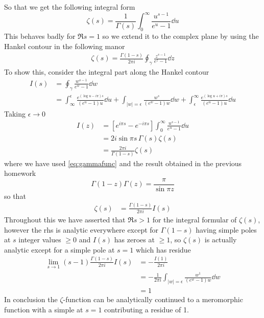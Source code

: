 \documentclass[a4paper,12pt]{article}
\begin{document}
So that we get the following integral form
\begin{equation}\label{eq:gammafunc}
\zeta(s)=\frac{1}{\Gamma(s)}\int_0^\infty \frac{u^{s-1}}{e^{u}-1}\dd u
\end{equation}
This behaves badly for $\Re s=1$ so we extend it to the complex plane by using the Hankel contour in the following manor
\begin{equation}
	\begin{aligned}
		\zeta(s)=\frac{\Gamma(1-s)}{2\pi i}\oint_\gamma \frac{z^{s-1}}{e^{z}-1} \dd z
	\end{aligned}
\end{equation}
To show this, consider the integral part along the Hankel contour 
\begin{equation}
	\begin{aligned}
		I(s)&=\oint_\gamma \frac{w^{s-1}}{e^{w}-1} \dd w\\
		&=\int_{\infty}^{\epsilon}\frac{e^{(\log u-i\pi)s}}{(e^{u}-1)u} \dd u+
		\int_{|w|=\epsilon} \frac{w^{s}}{(e^{w}-1)w} \dd w+\int^{\infty}_{\epsilon}\frac{e^{(\log u+i\pi)s}}{(e^{u}-1)u} \dd u
	\end{aligned}
\end{equation}
Taking $\epsilon\to 0$
\begin{equation}
	\begin{aligned}
		I(z)&=\left[e^{i\pi s}-e^{-i\pi s}\right]\int_0^\infty \frac{u^{s-1}}{e^{u}-1}\dd u\\
		&=2i\sin \pi s\, \Gamma(s)\zeta(s)\\
		&=\frac{2\pi i}{\Gamma(1-s)}\zeta(s)
	\end{aligned}
\end{equation}
where we have used \eqref{eq:gammafunc} and the result obtained in the previous homework
\begin{equation}
\Gamma(1-z)\Gamma(z)=\frac{\pi}{\sin \pi z}
\end{equation}
so that
\begin{equation}
	\begin{aligned}
		\zeta(s)&=\frac{\Gamma(1-s)}{2\pi i}I(s)
	\end{aligned}
\end{equation}
Throughout this we have asserted that $\Re s >1$ for the integral formular of $\zeta(s)$, however the rhs is analytic everywhere except for $\Gamma(1-s)$ having simple poles at $s$ integer values $\geq0$ and $I(s)$ has zeroes at $\geq1$, so $\zeta(s)$ is actually analytic except for a simple pole at $s=1$ which has residue
\begin{equation}
	\begin{aligned}
		\lim_{s\to 1}(s-1)\frac{\Gamma(1-s)}{2\pi i}I(s)&=-\frac{I(1)}{2\pi i}\\
		&=-\frac{1}{2\pi i}		\int_{|w|=\epsilon} \frac{w^{1}}{(e^{w}-1)w} \dd w\\
		&=1
	\end{aligned}
\end{equation}
In conclusion the $\zeta$-function can be analytically continued to a meromorphic function with a simple at $s=1$ contributing a residue of 1.
\end{document}
